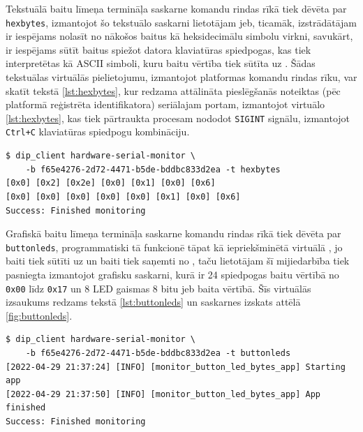 Tekstuālā baitu līmeņa termināļa saskarne komandu rindas rīkā tiek dēvēta par
\lstinline!hexbytes!, izmantojot šo tekstuālo saskarni
 lietotājam jeb, ticamāk, izstrādātājam ir iespējams
nolasīt no  nākošos baitus kā heksidecimālu simbolu
virkni, savukārt,  ir iespējams sūtīt baitus spiežot
datora klaviatūras spiedpogas, kas tiek interpretētas kā ASCII simboli, kuru
baitu vērtība tiek sūtīta uz . Šādas tekstuālas
virtuālās  pielietojumu, izmantojot platformas
komandu rindas rīku, var skatīt tekstā \ref{lst:hexbytes}, kur redzama
attālināta pieslēgšanās noteiktas  (pēc platformā
reģistrēta identifikatora) seriālajam portam, izmantojot virtuālo
 \ref{lst:hexbytes}, kas tiek pārtraukta procesam
nododot \lstinline!SIGINT! signālu, izmantojot \lstinline!Ctrl+C! klaviatūras
spiedpogu kombināciju.

\begin{lstlisting}[caption={\lstinline!hexbytes! izmantošana no komandu rindas},label={lst:hexbytes},captionpos=b]
$ dip_client hardware-serial-monitor \
    -b f65e4276-2d72-4471-b5de-bddbc833d2ea -t hexbytes
[0x0] [0x2] [0x2e] [0x0] [0x1] [0x0] [0x6] 
[0x0] [0x0] [0x0] [0x0] [0x0] [0x1] [0x0] [0x6]  
Success: Finished monitoring
\end{lstlisting}

Grafiskā baitu līmeņa termināļa saskarne komandu rindas rīkā tiek dēvēta par
\lstinline!buttonleds!, programmatiski tā funkcionē tāpat kā iepriekšminētā
virtuālā \glslink{vinterface}{saskarne}, jo baiti tiek sūtīti uz
\glslink{board}{aparatūru} un baiti tiek saņemti no ,
taču lietotājam šī mijiedarbība tiek pasniegta izmantojot grafisku saskarni,
kurā ir 24 spiedpogas baitu vērtībā no \lstinline!0x00! līdz \lstinline!0x17! un
8 LED gaismas 8 bitu jeb baita vērtībā. Šīs virtuālās
 izsaukums redzams tekstā \ref{lst:buttonleds} un
saskarnes izskats attēlā \ref{fig:buttonleds}.

\begin{lstlisting}[caption={\lstinline!buttonleds! izsaukums no komandu rindas},label={lst:buttonleds},captionpos=b]
$ dip_client hardware-serial-monitor \
    -b f65e4276-2d72-4471-b5de-bddbc833d2ea -t buttonleds
[2022-04-29 21:37:24] [INFO] [monitor_button_led_bytes_app] Starting app
[2022-04-29 21:37:50] [INFO] [monitor_button_led_bytes_app] App finished
Success: Finished monitoring
\end{lstlisting}


